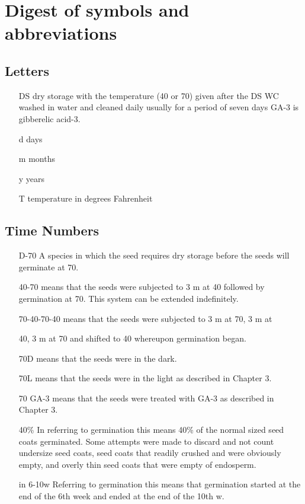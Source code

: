 \chapter{Digest of symbols and abbreviations}

\section{Letters}

\begin{itemize}
\item[DS] dry storage with the temperature (40 or 70) given after the DS
WC washed in water and cleaned daily usually for a period of seven days
GA-3 is gibberelic acid-3.
\item[d] days
\item[m] months
\item[y] years
\item[T] temperature in degrees Fahrenheit
\end{itemize}

\section{Time Numbers}

\begin{itemize}
\item[D-70] A species in which the seed requires dry storage before the seeds
will germinate at 70.
\item[40-70] means that the seeds were subjected to 3 m at 40 followed by
germination at 70. This system can be extended indefinitely.
\item[70-40-70-40] means that the seeds were subjected to 3 m at 70, 3 m at
\item[40, 3 m at 70] and shifted to 40 whereupon germination began.
\item[70D] means that the seeds were in the dark.
\item[70L] means that the seeds were in the light as described in Chapter 3.
\item[70 GA-3] means that the seeds were treated with GA-3 as described in Chapter 3.
\item[40\%] In referring to germination this means 40\% of the normal sized seed coats
germinated. Some attempts were made to discard and not count undersize
seed coats, seed coats that readily crushed and were obviously empty, and
overly thin seed coats that were empty of endosperm.
\item[in 6-10w] Referring to germination this means that germination started at the end of
the 6th week and ended at the end of the 10th w.
\end{itemize}

